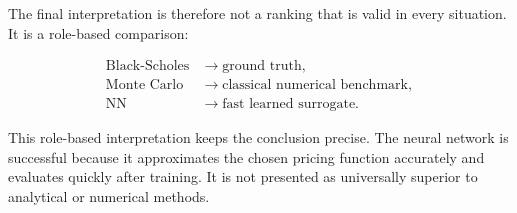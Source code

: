 The final interpretation is therefore not a ranking that is valid in every situation.
It is a role-based comparison:

\begin{align}
    \text{Black-Scholes}
     & \rightarrow
    \text{ground truth},                  \\
    \text{Monte Carlo}
     & \rightarrow
    \text{classical numerical benchmark}, \\
    \text{NN}
     & \rightarrow
    \text{fast learned surrogate}.
\end{align}

This role-based interpretation keeps the conclusion precise.
The neural network is successful because it approximates the chosen pricing function accurately and evaluates quickly after training.
It is not presented as universally superior to analytical or numerical methods.
